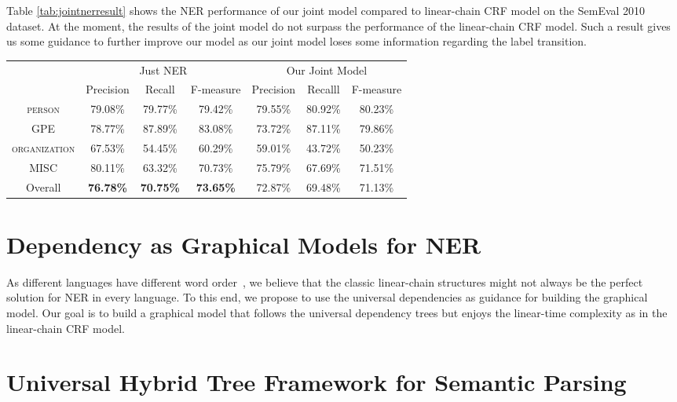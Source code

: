 Table \ref{tab:jointnerresult} shows the NER performance of our joint model compared to linear-chain CRF model on the SemEval 2010 dataset. 
At the moment, the results of the joint model do not surpass the performance of the linear-chain CRF model. 
Such a result gives us some guidance to further improve our model as our joint model loses some information regarding the label transition. 
\begin{table*}[h!]
	\centering
	\begin{tabular}{ccccccc}
		\toprule
		& \multicolumn{3}{c}{Just NER}  & \multicolumn{3}{c}{Our Joint Model}\\
		& Precision&Recall&F-measure & Precision&Recalll&F-measure \\ 
		\midrule
		\textsc{person}& 79.08\% & 79.77\%  & 79.42\%& 79.55\%  & 80.92\%  & 80.23\% \\
		\textsc{GPE} & 78.77\% & 87.89\% & 83.08\%  & 73.72\%  & 87.11\%  & 79.86\% \\ 
		\textsc{organization} & 67.53\%   & 54.45\% & 60.29\%  &59.01\% & 43.72\% & 50.23\% \\
		\textsc{MISC} & 80.11\%   & 63.32\% & 70.73\%   & 75.79\% & 67.69\% & 71.51\%  \\
		Overall & \textbf{76.78\%}   & \textbf{70.75\%} & \textbf{73.65\%}  & 72.87\% & 69.48\% & 71.13\% \\
		\bottomrule
	\end{tabular}
	\caption{Named Entity Recognition Results on SemEval 2010 dataset with both dependency and named entity information annotated. }
	\label{tab:jointnerresult}
\end{table*}




\section{Dependency as Graphical Models for NER}
As different languages have different word order~\cite{ahmad2019difficulties}, we believe that the classic linear-chain structures might not always be the perfect solution for NER in every language. 
To this end, we propose to use the universal dependencies as guidance for building the graphical model. 
Our goal is to build a graphical model that follows the universal dependency trees but enjoys the linear-time complexity as in the linear-chain CRF model. 




\section{Universal Hybrid Tree Framework for Semantic Parsing}

